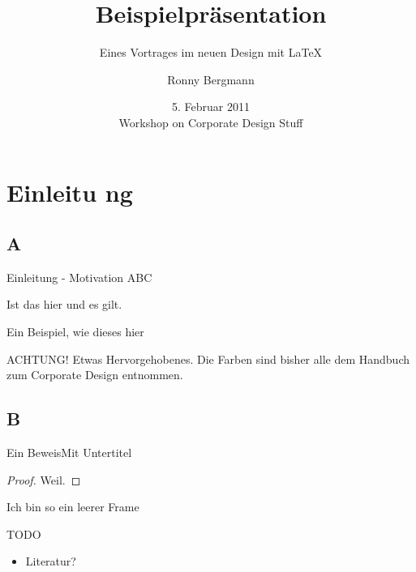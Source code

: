 \documentclass[german,10pt,xcolor=colortbl,compress
]{beamer}
\title{Beispielpräsentation}
\subtitle{Eines Vortrages im neuen Design mit \LaTeX}
\date[]{5. Februar 2011\\[1ex] Workshop on Corporate Design Stuff}
\author[R. Bergmann]{Ronny Bergmann}
\institute[Universität zu Lübeck]{Institut für Mathematik\\Universität zu Lübeck}
\begin{document}
	\maketitle	
	\section{Einleitu ng}
	\begin{frame}{}
		\tableofcontents
	\end{frame}
	\subsection{A}
	\begin{frame}{Einleitung - Motivation}
	ABC
	\begin{lemma}
		Ist das hier und es gilt.
	\end{lemma}
	\begin{example}
		Ein Beispiel, wie dieses hier
	\end{example}
	\alert{ACHTUNG!}
		Etwas Hervorgehobenes. Die Farben sind bisher alle dem Handbuch zum Corporate Design entnommen.
	\end{frame}
	\subsection{B}
	\begin{frame}{Ein Beweis}{Mit Untertitel}
			\begin{proof}
				Weil.
			\end{proof}
	\end{frame}
	\begin{frame}[plain]{}{}%
		Ich bin so ein leerer Frame
	\end{frame}
	
	\begin{frame}{TODO}
		\begin{itemize}
			\item Literatur?
		\end{itemize}
	\end{frame}
\end{document}
